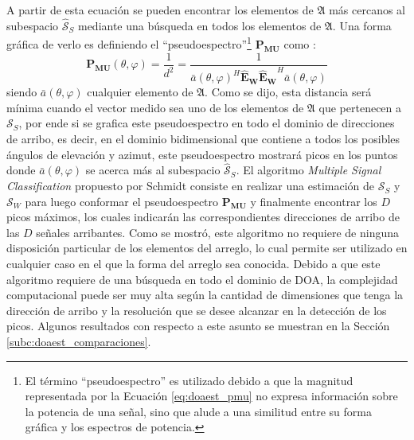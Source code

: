 A partir de esta ecuación se pueden encontrar los elementos de $\mathfrak{A}$ más cercanos al subespacio $\hat{\mathcal{S}}_S$ mediante una búsqueda en todos los elementos de $\mathfrak{A}$. Una forma gráfica de verlo es definiendo el ``pseudoespectro''\footnote{El término ``pseudoespectro'' es utilizado debido a que la magnitud representada por la Ecuación \ref{eq:doaest_pmu} no expresa información sobre la potencia de una señal, sino que alude a una similitud entre su forma gráfica y los espectros de potencia.} $\mathbf{P_{MU}}$ como \cite{bib:music_schmidt}:
\begin{equation}
    \mathbf{P_{MU}}(\theta,\varphi)=\frac{1}{d^2}=\frac{1}{\bar{a}(\theta,\varphi)^H\mathbf{\hat{E}_W}\mathbf{\hat{E}_W}^H\bar{a}(\theta,\varphi)}
    \label{eq:doaest_pmu}
\end{equation}
siendo $\bar{a}(\theta,\varphi)$ cualquier elemento de $\mathfrak{A}$.
Como se dijo, esta distancia será mínima cuando el vector medido sea uno de los elementos de $\mathfrak{A}$ que pertenecen a $\mathcal{S}_S$, por ende si se grafica este pseudoespectro en todo el dominio de direcciones de arribo, es decir, en el dominio bidimensional que contiene a todos los posibles ángulos de elevación y azimut, este pseudoespectro mostrará picos en los puntos donde $\bar{a}(\theta,\varphi)$ se acerca más al subespacio $\hat{\mathcal{S}}_S$.
El algoritmo \emph{Multiple Signal Classification} propuesto por Schmidt consiste en realizar una estimación de $\mathcal{S}_S$ y $\mathcal{S}_W$ para luego conformar el pseudoespectro $\mathbf{P_{MU}}$ y finalmente encontrar los $D$ picos máximos, los cuales indicarán las correspondientes direcciones de arribo de las $D$ señales arribantes. Como se mostró, este algoritmo no requiere de ninguna disposición particular de los elementos del arreglo, lo cual permite ser utilizado en cualquier caso en el que la forma del arreglo sea conocida. Debido a que este algoritmo requiere de una búsqueda en todo el dominio de DOA, la complejidad computacional puede ser muy alta según la cantidad de dimensiones que tenga la dirección de arribo y la resolución que se desee alcanzar en la detección de los picos. Algunos resultados con respecto a este asunto se muestran en la Sección \ref{subc:doaest_comparaciones}.

